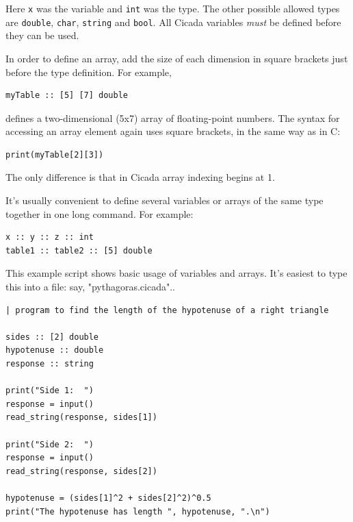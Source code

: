 \documentclass{article}
\newenvironment{code}{
       \begin{list}{}{
               \setlength{\leftmargin}{.4in}
               \setlength{\rightmargin}{0in}
               \setlength{\topsep}{.2in}
       }
       \small
       \item[] }
       { \end{list}   }
\begin{document}
\noindent Here \verb#x# was the variable and \verb#int# was the type.  The other possible allowed types are \verb#double#, \verb#char#, \verb#string# and \verb#bool#.  All Cicada variables \emph{must} be defined before they can be used.

In order to define an array, add the size of each dimension in square brackets just before the type definition.  For example,

\begin{code} \begin{verbatim}
myTable :: [5] [7] double
\end{verbatim} \end{code}

\noindent defines a two-dimensional (5x7) array of floating-point numbers.  The syntax for accessing an array element again uses square brackets, in the same way as in C:

\begin{code} \begin{verbatim}
print(myTable[2][3])
\end{verbatim} \end{code}

\noindent The only difference is that in Cicada array indexing begins at 1.

It's usually convenient to define several variables or arrays of the same type together in one long command.  For example:

\begin{code} \begin{verbatim}
x :: y :: z :: int
table1 :: table2 :: [5] double
\end{verbatim} \end{code}

This example script shows basic usage of variables and arrays.  It's easiest to type this into a file: say, "pythagoras.cicada"..

\begin{code} \begin{verbatim}
| program to find the length of the hypotenuse of a right triangle

sides :: [2] double
hypotenuse :: double
response :: string

print("Side 1:  ")
response = input()
read_string(response, sides[1])

print("Side 2:  ")
response = input()
read_string(response, sides[2])

hypotenuse = (sides[1]^2 + sides[2]^2)^0.5
print("The hypotenuse has length ", hypotenuse, ".\n")
\end{verbatim} \end{code}
\end{document}
